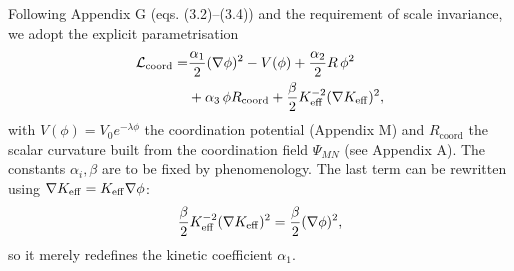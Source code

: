 \documentclass[12pt,a4paper]{article}
\newcommand{\Keff}[1][]{K_{\mathrm{eff}\if\relax\detokenize{#1}\relax\else,#1\fi}}   %
\begin{document}
	Following Appendix G (eqs. (3.2)–(3.4)) and the requirement of scale invariance, we adopt the explicit parametrisation
	\begin{equation}
		\begin{aligned}
			\mathcal{L}_{\text{coord}} = &\frac{\alpha_1}{2}(\nabla\phi)^2 - V(\phi) + \frac{\alpha_2}{2} R\,\phi^2 \\
			&+ \alpha_3\,\phi R_{\text{coord}} + \frac{\beta}{2}\Keff^{-2}(\nabla\Keff)^2,
		\end{aligned}
		\label{eq:coord-lagrangian}
	\end{equation}
	with $V(\phi)=V_0 e^{-\lambda\phi}$ the coordination potential (Appendix M) and $R_{\text{coord}}$ the scalar curvature built from the coordination field $\Psi_{MN}$ (see Appendix A). The constants $\alpha_i,\beta$ are to be fixed by phenomenology. The last term can be rewritten using $\nabla\Keff = \Keff\nabla\phi$:
	\[
	\frac{\beta}{2}\Keff^{-2}(\nabla\Keff)^2 = \frac{\beta}{2}(\nabla\phi)^2,
	\]
	so it merely redefines the kinetic coefficient $\alpha_1$.
	
\end{document}

